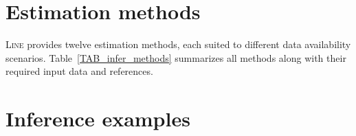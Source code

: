 \section{Estimation methods}
\label{infer-estimation-methods}

\textsc{Line} provides twelve estimation methods, each suited to different data availability scenarios. Table~\ref{TAB_infer_methods} summarizes all methods along with their required input data and references.



\section{Inference examples}
\label{infer-examples}

